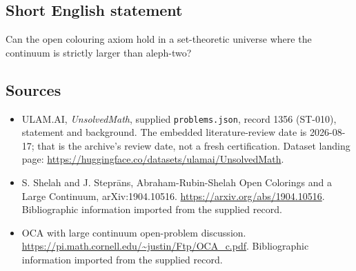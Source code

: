 \documentclass[11pt,a4paper]{article}
\begin{document}
\subsection{Short English statement}

Can the open colouring axiom hold in a set-theoretic universe where the continuum is strictly larger than aleph-two?

\subsection{Sources}

{\small

\begin{itemize}

\item[\hypertarget{source:1356:1}{S1}] ULAM.AI, \emph{UnsolvedMath}, supplied \texttt{problems.json}, record 1356 (ST-010), statement and background. The embedded literature-review date is 2026-08-17; that is the archive’s review date, not a fresh certification. Dataset landing page: \url{https://huggingface.co/datasets/ulamai/UnsolvedMath}.

\item[\hypertarget{source:1356:2}{S2}] S. Shelah and J. Steprāns, Abraham-Rubin-Shelah Open Colorings and a Large Continuum, arXiv:1904.10516. \url{https://arxiv.org/abs/1904.10516}. Bibliographic information imported from the supplied record.

\item[\hypertarget{source:1356:3}{S3}] OCA with large continuum open-problem discussion. \url{https://pi.math.cornell.edu/~justin/Ftp/OCA_c.pdf}. Bibliographic information imported from the supplied record.

\end{itemize}

}

\label{end:1356}
\end{document}

